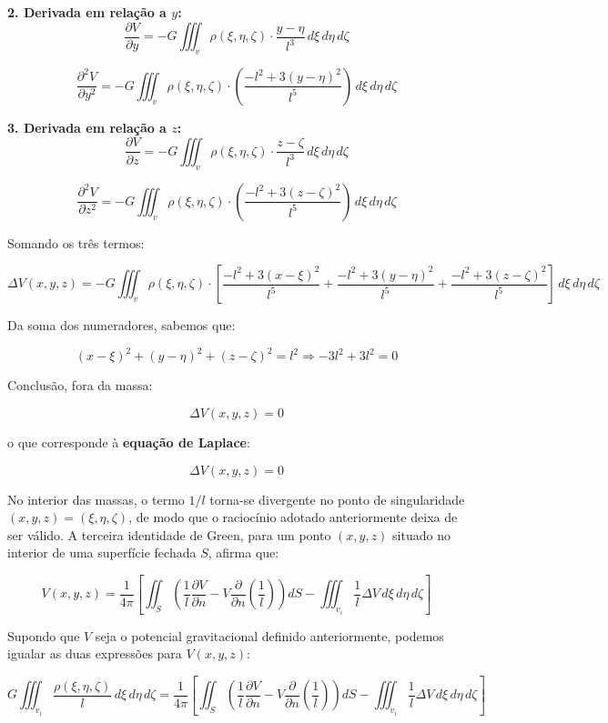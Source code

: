 \textbf{2. Derivada em relação a \( y \):}
\[
\frac{\partial V}{\partial y}
= -G \iiint_v \rho(\xi, \eta, \zeta) \cdot \frac{y - \eta}{l^3} \, d\xi \, d\eta \, d\zeta
\]

\[
\frac{\partial^2 V}{\partial y^2}
= -G \iiint_v \rho(\xi, \eta, \zeta) \cdot \left( \frac{-l^2 + 3(y - \eta)^2}{l^5} \right) \, d\xi \, d\eta \, d\zeta
\]

\textbf{3. Derivada em relação a \( z \):}
\[
\frac{\partial V}{\partial z}
= -G \iiint_v \rho(\xi, \eta, \zeta) \cdot \frac{z - \zeta}{l^3} \, d\xi \, d\eta \, d\zeta
\]

\[
\frac{\partial^2 V}{\partial z^2}
= -G \iiint_v \rho(\xi, \eta, \zeta) \cdot \left( \frac{-l^2 + 3(z - \zeta)^2}{l^5} \right) \, d\xi \, d\eta \, d\zeta
\]

\noindent
Somando os três termos:

\[
\Delta V(x, y, z) =
-G \iiint_v \rho(\xi, \eta, \zeta)
\cdot \left[
\frac{-l^2 + 3(x - \xi)^2}{l^5} +
\frac{-l^2 + 3(y - \eta)^2}{l^5} +
\frac{-l^2 + 3(z - \zeta)^2}{l^5}
\right]
\, d\xi \, d\eta \, d\zeta
\]

\noindent
Da soma dos numeradores, sabemos que:

\[
(x - \xi)^2 + (y - \eta)^2 + (z - \zeta)^2 = l^2
\Rightarrow -3l^2 + 3l^2 = 0
\]

\noindent
Conclusão, fora da massa:

\[
\Delta V(x, y, z) = 0
\]

o que corresponde à \textbf{equação de Laplace}:

\[
\boxed{\Delta V(x, y, z) = 0}
\]

No interior das massas, o termo \( 1/l \) torna-se divergente no ponto de singularidade \( (x, y, z) = (\xi, \eta, \zeta) \), de modo que o raciocínio adotado anteriormente deixa de ser válido. A terceira identidade de Green, para um ponto $(x, y, z)$ situado no interior de uma superfície fechada $S$, afirma que:

\begin{equation}
V(x, y, z) = \frac{1}{4\pi} \left[ \iint_S \left( \frac{1}{l} \frac{\partial V}{\partial n} - V \frac{\partial}{\partial n} \left( \frac{1}{l} \right) \right) dS - \iiint_{v_i} \frac{1}{l} \Delta V \, d\xi \, d\eta \, d\zeta \right]
\end{equation}

\noindent
Supondo que $V$ seja o potencial gravitacional definido anteriormente, podemos igualar as duas expressões para $V(x, y, z)$:

\begin{equation}
G \iiint_{v_i} \frac{\rho(\xi, \eta, \zeta)}{l} \, d\xi \, d\eta \, d\zeta =
\frac{1}{4\pi} \left[ \iint_S \left( \frac{1}{l} \frac{\partial V}{\partial n} - V \frac{\partial}{\partial n} \left( \frac{1}{l} \right) \right) dS - \iiint_{v_i} \frac{1}{l} \Delta V \, d\xi \, d\eta \, d\zeta \right]
\end{equation}

